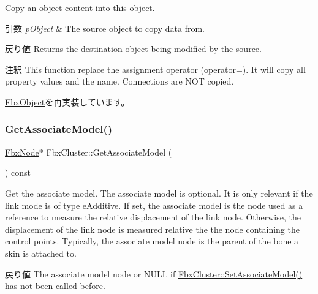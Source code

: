 Copy an object content into this object. 
\begin{DoxyParams}{引数}
{\em p\+Object} & The source object to copy data from. \\
\hline
\end{DoxyParams}
\begin{DoxyReturn}{戻り値}
Returns the destination object being modified by the source. 
\end{DoxyReturn}
\begin{DoxyRemark}{注釈}
This function replace the assignment operator (operator=). It will copy all property values and the name. Connections are N\+OT copied. 
\end{DoxyRemark}


\hyperlink{class_fbx_object_a0c0c5adb38284d14bb82c04d54504a3e}{Fbx\+Object}を再実装しています。

\mbox{\label{class_fbx_cluster_a08f922ec0002197f4f8657d84af1d7fc}} 
\subsubsection{\texorpdfstring{Get\+Associate\+Model()}{GetAssociateModel()}}
{\footnotesize\ttfamily \hyperlink{class_fbx_node}{Fbx\+Node}$\ast$ Fbx\+Cluster\+::\+Get\+Associate\+Model (\begin{DoxyParamCaption}{ }\end{DoxyParamCaption}) const}

Get the associate model. The associate model is optional. It is only relevant if the link mode is of type e\+Additive. If set, the associate model is the node used as a reference to measure the relative displacement of the link node. Otherwise, the displacement of the link node is measured relative the the node containing the control points. Typically, the associate model node is the parent of the bone a skin is attached to. \begin{DoxyReturn}{戻り値}
The associate model node or {\ttfamily N\+U\+LL} if \hyperlink{class_fbx_cluster_a561e81f78f469d7579879f0f27c9c6de}{Fbx\+Cluster\+::\+Set\+Associate\+Model()} has not been called before. 
\end{DoxyReturn}
\mbox{\label{class_fbx_cluster_a02f2bebebf9d32a81540921990a071b4}} 
